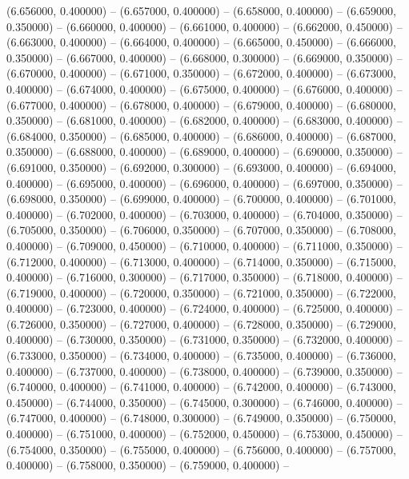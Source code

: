 (6.656000, 0.400000) -- 
(6.657000, 0.400000) -- 
(6.658000, 0.400000) -- 
(6.659000, 0.350000) -- 
(6.660000, 0.400000) -- 
(6.661000, 0.400000) -- 
(6.662000, 0.450000) -- 
(6.663000, 0.400000) -- 
(6.664000, 0.400000) -- 
(6.665000, 0.450000) -- 
(6.666000, 0.350000) -- 
(6.667000, 0.400000) -- 
(6.668000, 0.300000) -- 
(6.669000, 0.350000) -- 
(6.670000, 0.400000) -- 
(6.671000, 0.350000) -- 
(6.672000, 0.400000) -- 
(6.673000, 0.400000) -- 
(6.674000, 0.400000) -- 
(6.675000, 0.400000) -- 
(6.676000, 0.400000) -- 
(6.677000, 0.400000) -- 
(6.678000, 0.400000) -- 
(6.679000, 0.400000) -- 
(6.680000, 0.350000) -- 
(6.681000, 0.400000) -- 
(6.682000, 0.400000) -- 
(6.683000, 0.400000) -- 
(6.684000, 0.350000) -- 
(6.685000, 0.400000) -- 
(6.686000, 0.400000) -- 
(6.687000, 0.350000) -- 
(6.688000, 0.400000) -- 
(6.689000, 0.400000) -- 
(6.690000, 0.350000) -- 
(6.691000, 0.350000) -- 
(6.692000, 0.300000) -- 
(6.693000, 0.400000) -- 
(6.694000, 0.400000) -- 
(6.695000, 0.400000) -- 
(6.696000, 0.400000) -- 
(6.697000, 0.350000) -- 
(6.698000, 0.350000) -- 
(6.699000, 0.400000) -- 
(6.700000, 0.400000) -- 
(6.701000, 0.400000) -- 
(6.702000, 0.400000) -- 
(6.703000, 0.400000) -- 
(6.704000, 0.350000) -- 
(6.705000, 0.350000) -- 
(6.706000, 0.350000) -- 
(6.707000, 0.350000) -- 
(6.708000, 0.400000) -- 
(6.709000, 0.450000) -- 
(6.710000, 0.400000) -- 
(6.711000, 0.350000) -- 
(6.712000, 0.400000) -- 
(6.713000, 0.400000) -- 
(6.714000, 0.350000) -- 
(6.715000, 0.400000) -- 
(6.716000, 0.300000) -- 
(6.717000, 0.350000) -- 
(6.718000, 0.400000) -- 
(6.719000, 0.400000) -- 
(6.720000, 0.350000) -- 
(6.721000, 0.350000) -- 
(6.722000, 0.400000) -- 
(6.723000, 0.400000) -- 
(6.724000, 0.400000) -- 
(6.725000, 0.400000) -- 
(6.726000, 0.350000) -- 
(6.727000, 0.400000) -- 
(6.728000, 0.350000) -- 
(6.729000, 0.400000) -- 
(6.730000, 0.350000) -- 
(6.731000, 0.350000) -- 
(6.732000, 0.400000) -- 
(6.733000, 0.350000) -- 
(6.734000, 0.400000) -- 
(6.735000, 0.400000) -- 
(6.736000, 0.400000) -- 
(6.737000, 0.400000) -- 
(6.738000, 0.400000) -- 
(6.739000, 0.350000) -- 
(6.740000, 0.400000) -- 
(6.741000, 0.400000) -- 
(6.742000, 0.400000) -- 
(6.743000, 0.450000) -- 
(6.744000, 0.350000) -- 
(6.745000, 0.300000) -- 
(6.746000, 0.400000) -- 
(6.747000, 0.400000) -- 
(6.748000, 0.300000) -- 
(6.749000, 0.350000) -- 
(6.750000, 0.400000) -- 
(6.751000, 0.400000) -- 
(6.752000, 0.450000) -- 
(6.753000, 0.450000) -- 
(6.754000, 0.350000) -- 
(6.755000, 0.400000) -- 
(6.756000, 0.400000) -- 
(6.757000, 0.400000) -- 
(6.758000, 0.350000) -- 
(6.759000, 0.400000) -- 
